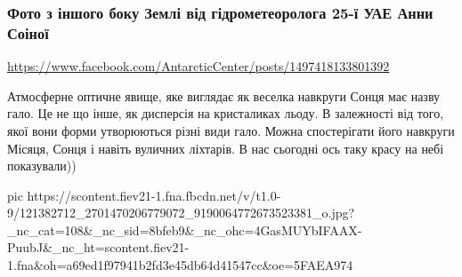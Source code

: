  


\subsubsection{Фото з іншого боку Землі від гідрометеоролога 25-ї УАЕ Анни Соіної}
\label{sec:16_10_2020.fb.ukr_antarctic_centre.3.anna_soina_halo}

\url{https://www.facebook.com/AntarcticCenter/posts/1497418133801392}

Атмосферне оптичне явище, яке виглядає як веселка навкруги Сонця має назву
гало. Це не що інше, як дисперсія на кристаликах льоду. В залежності від того,
якої вони форми утворюються різні види гало. Можна спостерігати його навкруги
Місяця, Сонця і навіть вуличних ліхтарів. В нас сьогодні ось таку красу на небі
показували))

\ifcmt
pic https://scontent.fiev21-1.fna.fbcdn.net/v/t1.0-9/121382712_2701470206779072_9190064772673523381_o.jpg?_nc_cat=108&_nc_sid=8bfeb9&_nc_ohc=4GasMUYbIFAAX-PuubJ&_nc_ht=scontent.fiev21-1.fna&oh=a69ed1f97941b2fd3e45db64d41547cc&oe=5FAEA974
\fi
